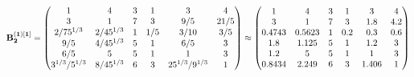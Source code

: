 \documentclass[10pt,a4paper]{article}
\begin{document}
	\[
		\bold{B_2^{(1)[1]}} = 
		\begin{pmatrix}
			{1}{} & {{4}}{} & {{3}}{} & {1}{} & {{3}}{} & {{4}}{} \\
			{{3}}{} & {1}{} & {{7}}{} & {{3}}{} & {{9}} / {{5}} & {{21}} / {{5}} \\
			{{2}} / {{75^ {1 / 3}}} & {{2}} / {{45^ {1 / 3}}} & {1}{} & {1} / {{5}} & {{3}} / {{10}} & {{3}} / {{5}} \\
			{{9}} / {{5}} & {{4}} / {{45^ {1 / 3}}} & {{5}}{} & {1}{} & {{6}} / {{5}} & {{3}}{} \\
			{{6}} / {{5}} & {{5}}{} & {{5}}{} & {1}{} & {1}{} & {{3}}{} \\
			{{3^ {1 / 3}}} / {{5^ {1 / 3}}} & {{8}} / {{45^ {1 / 3}}} & {{6}}{} & {{3}}{} & {{25^ {1 / 3}}} / {{9^ {1 / 3}}} & {1}{} \\
		\end{pmatrix}
		\approx
		\begin{pmatrix}
			1        & 4        & 3        & 1        & 3        & 4        \\
			3        & 1        & 7        & 3        & 1.8      & 4.2      \\
			0.4743   & 0.5623   & 1        & 0.2      & 0.3      & 0.6      \\
			1.8      & 1.125    & 5        & 1        & 1.2      & 3        \\
			1.2      & 5        & 5        & 1        & 1        & 3        \\
			0.8434   & 2.249    & 6        & 3        & 1.406    & 1        \\
		\end{pmatrix}
	\]
\end{document}
